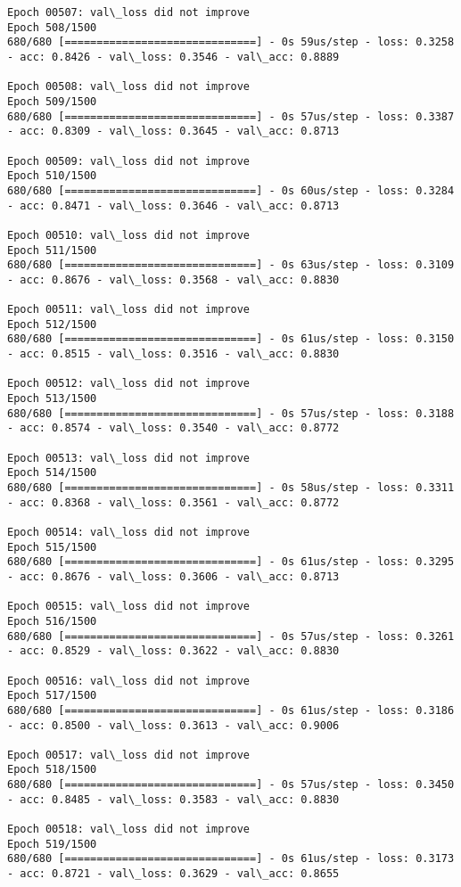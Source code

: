 \documentclass[11pt]{article}
\begin{document}
\begin{Verbatim}[commandchars=\\\{\}]
Epoch 00507: val\_loss did not improve
Epoch 508/1500
680/680 [==============================] - 0s 59us/step - loss: 0.3258 - acc: 0.8426 - val\_loss: 0.3546 - val\_acc: 0.8889

Epoch 00508: val\_loss did not improve
Epoch 509/1500
680/680 [==============================] - 0s 57us/step - loss: 0.3387 - acc: 0.8309 - val\_loss: 0.3645 - val\_acc: 0.8713

Epoch 00509: val\_loss did not improve
Epoch 510/1500
680/680 [==============================] - 0s 60us/step - loss: 0.3284 - acc: 0.8471 - val\_loss: 0.3646 - val\_acc: 0.8713

Epoch 00510: val\_loss did not improve
Epoch 511/1500
680/680 [==============================] - 0s 63us/step - loss: 0.3109 - acc: 0.8676 - val\_loss: 0.3568 - val\_acc: 0.8830

Epoch 00511: val\_loss did not improve
Epoch 512/1500
680/680 [==============================] - 0s 61us/step - loss: 0.3150 - acc: 0.8515 - val\_loss: 0.3516 - val\_acc: 0.8830

Epoch 00512: val\_loss did not improve
Epoch 513/1500
680/680 [==============================] - 0s 57us/step - loss: 0.3188 - acc: 0.8574 - val\_loss: 0.3540 - val\_acc: 0.8772

Epoch 00513: val\_loss did not improve
Epoch 514/1500
680/680 [==============================] - 0s 58us/step - loss: 0.3311 - acc: 0.8368 - val\_loss: 0.3561 - val\_acc: 0.8772

Epoch 00514: val\_loss did not improve
Epoch 515/1500
680/680 [==============================] - 0s 61us/step - loss: 0.3295 - acc: 0.8676 - val\_loss: 0.3606 - val\_acc: 0.8713

Epoch 00515: val\_loss did not improve
Epoch 516/1500
680/680 [==============================] - 0s 57us/step - loss: 0.3261 - acc: 0.8529 - val\_loss: 0.3622 - val\_acc: 0.8830

Epoch 00516: val\_loss did not improve
Epoch 517/1500
680/680 [==============================] - 0s 61us/step - loss: 0.3186 - acc: 0.8500 - val\_loss: 0.3613 - val\_acc: 0.9006

Epoch 00517: val\_loss did not improve
Epoch 518/1500
680/680 [==============================] - 0s 57us/step - loss: 0.3450 - acc: 0.8485 - val\_loss: 0.3583 - val\_acc: 0.8830

Epoch 00518: val\_loss did not improve
Epoch 519/1500
680/680 [==============================] - 0s 61us/step - loss: 0.3173 - acc: 0.8721 - val\_loss: 0.3629 - val\_acc: 0.8655


\end{Verbatim}
\end{document}

